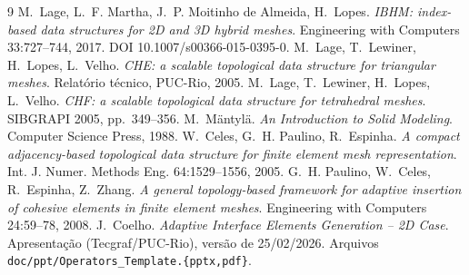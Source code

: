 \documentclass[11pt,a4paper]{article}
\newcommand{\code}[1]{\texttt{\small #1}}
\begin{document}
\newpage
\tableofcontents
\newpage










\begin{thebibliography}{9}\small
{} M.~Lage, L.~F. Martha, J.~P. Moitinho de Almeida, H.~Lopes.
  \emph{IBHM: index-based data structures for 2D and 3D hybrid meshes}.
  Engineering with Computers 33:727--744, 2017. DOI 10.1007/s00366-015-0395-0.
 M.~Lage, T.~Lewiner, H.~Lopes, L.~Velho. \emph{CHE: a scalable topological data structure for triangular
  meshes}. Relatório técnico, PUC-Rio, 2005.
 M.~Lage, T.~Lewiner, H.~Lopes, L.~Velho. \emph{CHF: a scalable topological data structure for
  tetrahedral meshes}. SIBGRAPI 2005, pp.~349--356.
 M.~Mäntylä. \emph{An Introduction to Solid Modeling}. Computer Science Press, 1988.
 W.~Celes, G.~H. Paulino, R.~Espinha. \emph{A compact adjacency-based topological data structure for
  finite element mesh representation}. Int. J. Numer. Methods Eng. 64:1529--1556, 2005.
 G.~H. Paulino, W.~Celes, R.~Espinha, Z.~Zhang. \emph{A general topology-based framework for adaptive
  insertion of cohesive elements in finite element meshes}. Engineering with Computers 24:59--78, 2008.
 J.~Coelho. \emph{Adaptive Interface Elements Generation -- 2D Case}. Apresentação (Tecgraf/PUC-Rio),
  versão de 25/02/2026. Arquivos \code{doc/ppt/Operators\_Template.\{pptx,pdf\}}.
\end{thebibliography}

\appendix

\end{document}
